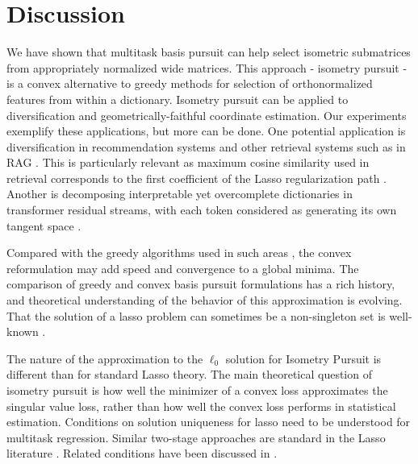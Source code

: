 \section{Discussion}
\label{sec:discussion}

We have shown that multitask basis pursuit can help select isometric submatrices from appropriately normalized wide matrices.
This approach - isometry pursuit - is a convex alternative to greedy methods for selection of orthonormalized features from within a dictionary.
Isometry pursuit can be applied to diversification and geometrically-faithful coordinate estimation.
Our experiments exemplify these applications, but more can be done.
One potential application is diversification in recommendation systems \citep{Carbonell2017-gi, Wu2019-uk, Langchain} and other retrieval systems such as in RAG \citep{Gao2023-cn, Pickett2024-ad, In2024-um, Weiss2024-xm, Vectara}.
This is particularly relevant as maximum cosine similarity used in retrieval corresponds to the first coefficient of the Lasso regularization path \citep{Koelle2022-ju}.
Another is decomposing interpretable yet overcomplete dictionaries in transformer residual streams, with each token considered as generating its own tangent space \citep{templeton2024scaling, Makelov2024-bw}.

Compared with the greedy algorithms used in such areas \citep{Carbonell1998-ji, Barioni, Drosou, Qin2012-ok, KUNAVER2017154, Guo-shengbo, Abdool,Yu2016AGA,  Huang2024-wr, Pickett2024-ad}, the convex reformulation may add speed and convergence to a global minima.
The comparison of greedy \cite{Mallat93-wi, Mallat, Pati-93, Tropp05-ml} and convex \citep{Chen2001-hh, Tropp06-sg,Chen2006TheoreticalRO} basis pursuit formulations has a rich history, and theoretical understanding of the behavior of this approximation is evolving.
That the solution of a lasso problem can sometimes be a non-singleton set is well-known \citep{Osborne2000OnTL, DOSSAL2012117, Chrtien2011OnTG, Tibshirani2012TheLP, Ewald2017OnTD, Ali2018TheGL, Schneider2020-qt, Mishkin2022TheSP,Dupuis2019TheGO,Debarre2020OnTU,Everink2024TheGA}.

The nature of the approximation to the $\ell_0$ solution for Isometry Pursuit is different than for standard Lasso theory.
The main theoretical question of isometry pursuit is how well the minimizer of a convex loss approximates the singular value loss, rather than how well the convex loss performs in statistical estimation.
Conditions on solution uniqueness for lasso need to be understood for multitask regression.
Similar two-stage approaches are standard in the Lasso literature \cite{Hesterberg2008-iy, Koelle2022-ju}.
Related conditions have been discussed in \citet{Donoho2006ForML, Mishkin2022TheSP}.

